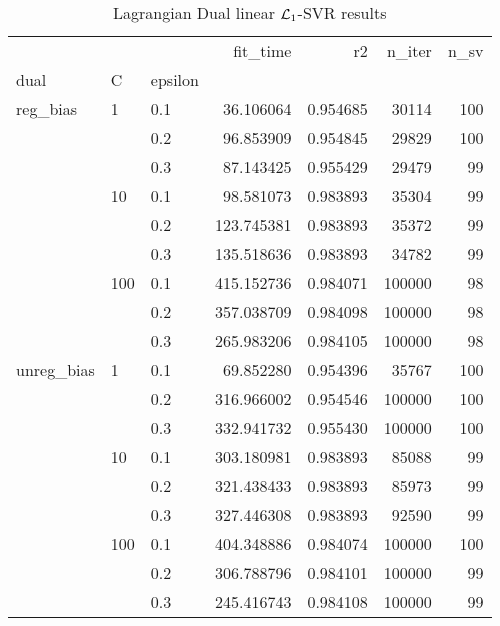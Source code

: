 \begin{table}[H]
\centering
\caption{Lagrangian Dual linear $\protect \mathcal{L}_1$-SVR results}
\label{linear_lagrangian_dual_l1_svr_cv_results}
\begin{tabular}{lllrrrr}
\toprule
           &     &     &    fit\_time &        r2 &  n\_iter &  n\_sv \\
dual & C & epsilon &             &           &         &       \\
\midrule
reg\_bias & 1   & 0.1 &   36.106064 &  0.954685 &   30114 &   100 \\
           &     & 0.2 &   96.853909 &  0.954845 &   29829 &   100 \\
           &     & 0.3 &   87.143425 &  0.955429 &   29479 &    99 \\
           & 10  & 0.1 &   98.581073 &  0.983893 &   35304 &    99 \\
           &     & 0.2 &  123.745381 &  0.983893 &   35372 &    99 \\
           &     & 0.3 &  135.518636 &  0.983893 &   34782 &    99 \\
           & 100 & 0.1 &  415.152736 &  0.984071 &  100000 &    98 \\
           &     & 0.2 &  357.038709 &  0.984098 &  100000 &    98 \\
           &     & 0.3 &  265.983206 &  0.984105 &  100000 &    98 \\
unreg\_bias & 1   & 0.1 &   69.852280 &  0.954396 &   35767 &   100 \\
           &     & 0.2 &  316.966002 &  0.954546 &  100000 &   100 \\
           &     & 0.3 &  332.941732 &  0.955430 &  100000 &   100 \\
           & 10  & 0.1 &  303.180981 &  0.983893 &   85088 &    99 \\
           &     & 0.2 &  321.438433 &  0.983893 &   85973 &    99 \\
           &     & 0.3 &  327.446308 &  0.983893 &   92590 &    99 \\
           & 100 & 0.1 &  404.348886 &  0.984074 &  100000 &   100 \\
           &     & 0.2 &  306.788796 &  0.984101 &  100000 &    99 \\
           &     & 0.3 &  245.416743 &  0.984108 &  100000 &    99 \\
\bottomrule
\end{tabular}
\end{table}

